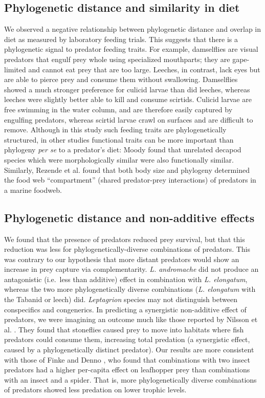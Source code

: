 \subsection{Phylogenetic distance and similarity in
diet}\label{phylogenetic-distance-and-similarity-in-diet}

We observed a negative relationship between phylogenetic distance and
overlap in diet as measured by laboratory feeding trials. This suggests
that there is a phylogenetic signal to predator feeding traits. For
example, damselflies are visual predators that engulf prey whole using
specialized mouthparts; they are gape-limited and cannot eat prey that
are too large. Leeches, in contrast, lack eyes but are able to pierce
prey and consume them without swallowing. Damselflies showed a much
stronger preference for culicid larvae than did leeches, whereas leeches
were slightly better able to kill and consume scirtids. Culicid larvae
are free swimming in the water column, and are therefore easily captured
by engulfing predators, whereas scirtid larvae crawl on surfaces and are
difficult to remove. Although in this study such feeding traits are
phylogenetically structured, in other studies functional traits can be
more important than phylogeny \emph{per se} to a predator's diet: Moody
\citeyearpar{Moody1993} found that unrelated decapod species which were
morphologically similar were also functionally similar. Similarly,
Rezende et al. \citeyearpar{Rezende2009} found that both body size and
phylogeny determined the food web ``compartment'' (shared predator-prey
interactions) of predators in a marine foodweb.

\subsection{Phylogenetic distance and non-additive
effects}\label{phylogenetic-distance-and-non-additive-effects}

We found that the presence of predators reduced prey survival, but that
this reduction was less for phylogenetically-diverse combinations of
predators. This was contrary to our hypothesis that more distant
predators would show an increase in prey capture via complementarity.
\emph{L. andromache} did not produce an antagonistic (i.e.~less than
additive) effect in combination with \emph{L. elongatum}, whereas the
two more phylogenetically diverse combinations (\emph{L. elongatum} with
the Tabanid or leech) did. \emph{Leptagrion} species may not distinguish
between conspecifics and congenerics. In predicting a synergistic
non-additive effect of predators, we were imagining an outcome much like
those reported by Nilsson et al. \citeyearpar{Nilsson2006c}. They found
that stoneflies caused prey to move into habitats where fish predators
could consume them, increasing total predation (a synergistic effect,
caused by a phylogenetically distinct predator). Our results are more
consistent with those of Finke and Denno \citeyearpar{Finke2005}, who
found that combinations with two insect predators had a higher
per-capita effect on leafhopper prey than combinations with an insect
and a spider. That is, more phylogenetically diverse combinations of
predators showed less predation on lower trophic levels.


